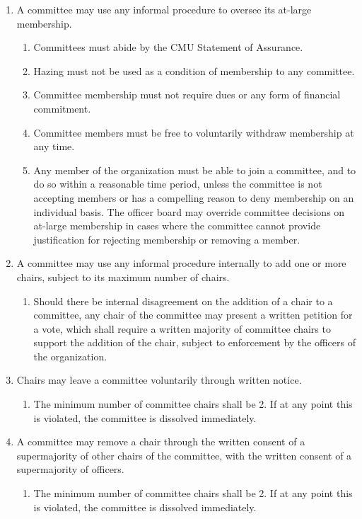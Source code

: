 \documentclass[11pt]{article}
\newcounter{h1}
\newcounter{h2}[h1]
\newcounter{h3}[h2]
\begin{document}
\begin{enumerate}
  \item A committee may use any informal procedure to oversee its at-large membership.
  \begin{enumerate}
    \item Committees must abide by the CMU Statement of Assurance.
    \item Hazing must not be used as a condition of membership to any committee.
    \item Committee membership must not require dues or any form of financial commitment.
    \item Committee members must be free to voluntarily withdraw membership at any time.
    \item Any member of the organization must be able to join a committee, and to do so within a reasonable time period, unless the committee is not accepting members or has a compelling reason to deny membership on an individual basis. The officer board may override committee decisions on at-large membership in cases where the committee cannot provide justification for rejecting membership or removing a member.
  \end{enumerate}
  \item A committee may use any informal procedure internally to add one or more chairs, subject to its maximum number of chairs.
  \begin{enumerate}
    \item Should there be internal disagreement on the addition of a chair to a committee, any chair of the committee may present a written petition for a vote, which shall require a written majority of committee chairs to support the addition of the chair, subject to enforcement by the officers of the organization.
  \end{enumerate}
  \item Chairs may leave a committee voluntarily through written notice.
  \begin{enumerate}
    \item The minimum number of committee chairs shall be 2. If at any point this is violated, the committee is dissolved immediately.
  \end{enumerate}
  \item A committee may remove a chair through the written consent of a supermajority of other chairs of the committee, with the written consent of a supermajority of officers.
  \begin{enumerate}
    \item The minimum number of committee chairs shall be 2. If at any point this is violated, the committee is dissolved immediately.

\end{enumerate}
\end{enumerate}
\end{document}
